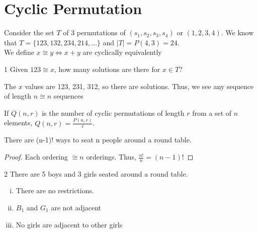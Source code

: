 \section{Cyclic Permutation}

Consider the set $T$ of 3 permutations of $(s_1, s_2, s_3, s_4)$ or $(1, 2, 3, 4)$. We know that $T = \{ 123, 132, 234, 214, ... \}$ and $|T| = P(4, 3) = 24$.\\

We define $x \cong y \iff x + y $ are cyclically equivalently 

\begin{problem}
    1 Given $123 \cong x$, how many solutions are there for $x \in T$?
\end{problem}

\begin{solution}
    The $x$ values are 123, 231, 312, so there are  solutions. Thus, we see any sequence of length $n \cong n$ sequences
\end{solution}

\begin{theorem}
    If $Q(n, r)$ is the number of cyclic permutations of length $r$ from a set of $n$ elements, $Q(n, r) = \frac{P(n, r)}{r}$.
\end{theorem}

\begin{theorem}
    There are (n-1)! ways to seat n people around a round table.
\end{theorem}

\begin{proof}
    Each ordering $\cong n$ orderings. Thus, $\frac{n!}{n} = (n-1)!$
\end{proof}

\begin{problem}
    2 There are 5 boys and 3 girls seated around a round table.
    \begin{enumerate}[(i)]
        \item There are no restrictions.
        \item $B_1$ and $G_1$ are not adjacent
        \item No girls are adjacent to other girls
    \end{enumerate}
\end{problem}

